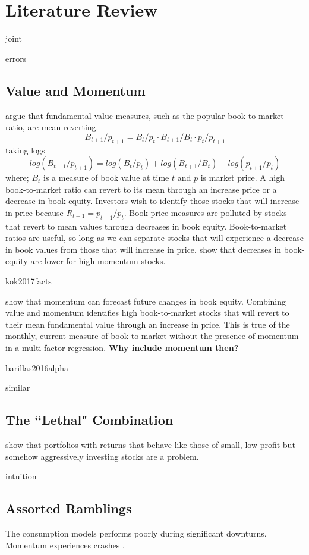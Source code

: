
\section{Literature Review}

{joint}

{errors}

\subsection{Value and Momentum}

\textcite{kok2017facts} argue  that fundamental value measures, such as the popular 
book-to-market ratio, are mean-reverting.
\[
B_{t+1}/p_{t+1} = B_t/p_t \cdot B_{t+1}/B_t \cdot p_t/p_{t+1}
\]
taking logs
\[
log(B_{t+1}/p_{t+1}) = log(B_{t}/p_{t}) + log(B_{t+1}/B_{t}) - log(p_{t+1}/p_{t})
\]
where; $B_t$ is a measure of book value at time $t$ and $p$ is market price.
A high book-to-market ratio can revert to its mean through an increase price or
a decrease in book equity.
Investors wish to identify those stocks that will increase in price because
$R_{t+1}=p_{t+1}/p_{t}$.
Book-price measures are polluted by stocks that revert to mean values through
decreases in book equity.
Book-to-market ratios are useful, so long as we can separate stocks that will
experience a decrease in book values from those that will increase in price.
\textcite{kok2017facts} show that decreases in book-equity are lower for high
momentum stocks.

{kok2017facts}

\textcite{asness2013devil} show that momentum can forecast future changes in
book equity.
Combining value and momentum identifies high book-to-market stocks that will
revert to their mean fundamental value through an increase in price.
This is true of the monthly, current measure of book-to-market without the
presence of momentum in a multi-factor regression.
\textbf{Why include momentum then?}


{barillas2016alpha}



{similar}


\subsection{The ``Lethal" Combination}

\textcite{fama2015five, fama2016choosing, fama2017international} show that portfolios with
returns that behave like those of small, low profit but somehow aggressively investing
stocks are a problem.

{intuition}

\subsection{Assorted Ramblings}

The consumption models performs poorly during significant downturns.
Momentum experiences crashes \parencite{daniel2016momentum}.

